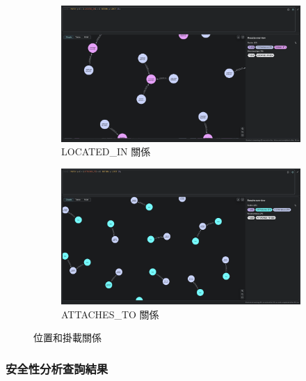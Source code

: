 \documentclass[11pt,a4paper]{ctexart}
\begin{document}
\begin{figure}[H]
\centering
\begin{subfigure}[b]{0.48\textwidth}
\centering
\includegraphics[width=\textwidth]{LOCATED_IN.png}
\caption{LOCATED\_IN 關係}
\label{fig:located_in}
\end{subfigure}
\hfill
\begin{subfigure}[b]{0.48\textwidth}
\centering
\includegraphics[width=\textwidth]{ATTACHES_TO.png}
\caption{ATTACHES\_TO 關係}
\label{fig:attaches_to}
\end{subfigure}
\caption{位置和掛載關係}
\label{fig:location_attachment_relationships}
\end{figure}

\subsubsection{安全性分析查詢結果}
\end{document}
